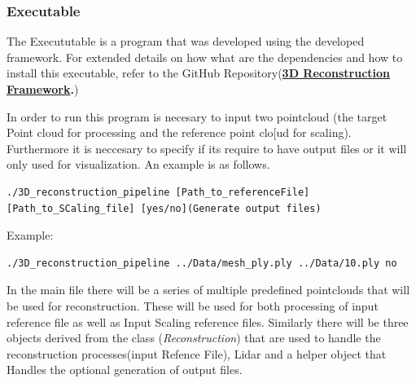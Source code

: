 \documentclass[12pt]{report}
\begin{document}
\subsubsection{Executable}
The Execututable is a program that was developed using the developed framework. For extended details on how what are the dependencies and how to install this executable, 
refer to the GitHub Repository(\textbf{\href{https://github.com/esteban-andrade/3D-Reconstructrion-Scanner} {3D Reconstruction Framework}.})

In order to run this program is necesary to input two pointcloud (the target Point cloud for processing and the reference point clo[ud for scaling). Furthermore it is neccesary to specify if its require to have output files or it will only used for visualization.
An example is as follows.


\scriptsize\begin{verbatim} 
./3D_reconstruction_pipeline [Path_to_referenceFile] [Path_to_SCaling_file] [yes/no](Generate output files)
\end{verbatim}
\normalsize

Example:

\small\begin{verbatim} 
./3D_reconstruction_pipeline ../Data/mesh_ply.ply ../Data/10.ply no
\end{verbatim}
\normalsize

In the main file there will be a series of multiple predefined pointclouds that will be used for reconstruction. These will be used for both processing  of input reference file as well as Input Scaling reference files. 
Similarly there will be three objects derived from the class (\textit{Reconstruction}) that are used to handle the reconstruction processes(input Refence File), Lidar and a helper object that Handles the optional generation of output files. 
\end{document}
